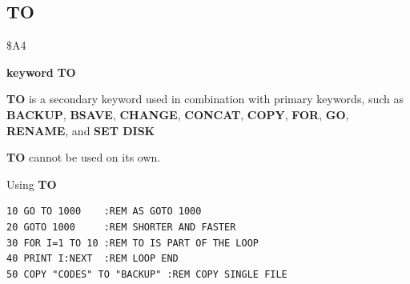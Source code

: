 
\newpage
\subsection{TO}
\begin{description}[leftmargin=2cm,style=nextline]
\item [Token:] \$A4
\item [Format:] {\bf keyword} {\bf TO}
\item [Usage:]  {\bf TO} is a secondary keyword used in
                combination with primary key\-words, such as
                {\bf BACKUP}, {\bf BSAVE}, {\bf CHANGE}, {\bf CONCAT},
                {\bf COPY}, {\bf FOR}, {\bf GO}, {\bf RENAME}, and {\bf SET DISK}

\item [Remarks:] {\bf TO} cannot be used on its own.

\item [Example:] Using {\bf TO}

\begin{tcolorbox}[colback=black,coltext=white]
\verbatimfont{\codefont}
\begin{verbatim}
10 GO TO 1000    :REM AS GOTO 1000
20 GOTO 1000     :REM SHORTER AND FASTER
30 FOR I=1 TO 10 :REM TO IS PART OF THE LOOP
40 PRINT I:NEXT  :REM LOOP END
50 COPY "CODES" TO "BACKUP" :REM COPY SINGLE FILE
\end{verbatim}
\end{tcolorbox}
\end{description}


\newpage
